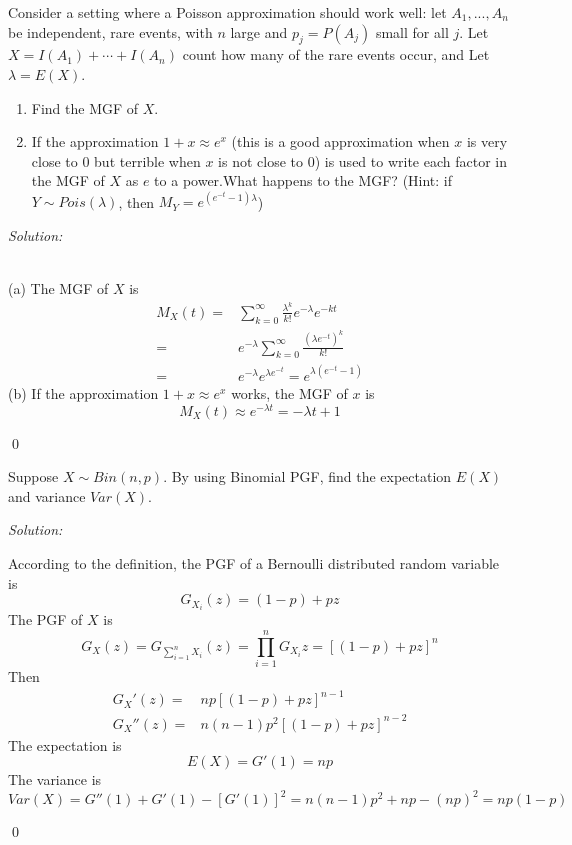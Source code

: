 \documentclass[12pt]{article}
\newenvironment{problem}[2][Problem]{\begin{trivlist}
\item[\hskip \labelsep {\bfseries #1}\hskip \labelsep {\bfseries #2.}]}{\end{trivlist}}
\newenvironment{sol}
    {\emph{Solution:}
    }
    {
    \qed
    }
\begin{document}
\begin{problem}{4}
Consider a setting where a Poisson approximation should work well: let $A_1,...,A_n$ be independent, rare events, with $n$ large and $p_j=P(A_j)$ small for all $j$. Let $X=I(A_1)+\cdots+I(A_n)$ count how many of the rare events occur, and Let $\lambda = E(X)$.
\begin{enumerate}
    \item[(a).] Find the MGF of $X$.
    \item[(b).] If the approximation $1+x\approx e^x$ (this is a good approximation when $x$ is very close to $0$ but terrible when $x$ is not close to $0$) is used to write each factor in the MGF of $X$ as $e$ to a power.What happens to the MGF? 
    (Hint: if $Y\sim Pois(\lambda)$, then $M_Y=e^{(e^{-t}-1)\lambda}$)
\end{enumerate}
\end{problem}
\begin{sol}
\\(a) The MGF of $X$ is
\begin{align*}
M_X(t)=&\sum_{k=0}^{\infty}\frac{\lambda^k}{k!}e^{-\lambda}e^{-kt}\\
=&e^{-\lambda}\sum_{k=0}^{\infty}\frac{(\lambda e^{-t})^k}{k!}\\
=&e^{-\lambda}e^{\lambda e^{-t}}=e^{\lambda(e^{-t}-1)}
\end{align*}
(b) If the approximation $1+x\approx e^x$ works, the MGF of $x$ is
\[
M_X(t)\approx e^{-\lambda t}=-\lambda t+1
\]
\end{sol}



\begin{problem}{5}
Suppose $X\sim Bin(n,p)$.
By using Binomial PGF, find the expectation $E(X)$ and variance $Var(X)$.
\end{problem}
\begin{sol}
According to the definition, the PGF of a Bernoulli distributed random variable is
\[
G_{X_i}(z)=(1-p)+pz
\]
The PGF of $X$ is
\[
G_{X}(z)=G_{\sum_{i=1}^nX_i}(z)=\prod_{i=1}^nG_{X_i}{z}=[(1-p)+pz]^n
\]
Then
\begin{align*}
G_X'(z)=&np[(1-p)+pz]^{n-1}\\
G_X''(z)=&n(n-1)p^2[(1-p)+pz]^{n-2}
\end{align*}
The expectation is
\[
E(X)=G'(1)=np
\]
The variance is
\[
Var(X)=G''(1)+G'(1)-[G'(1)]^2=n(n-1)p^2+np-(np)^2=np(1-p)
\]
\end{sol}
\end{document}
